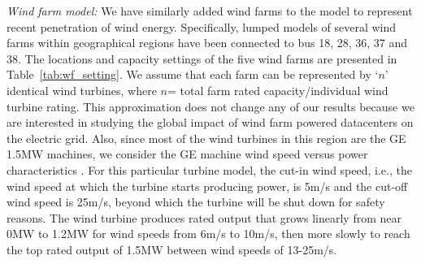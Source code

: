 {\em Wind farm model:}  We have similarly added wind farms to the model to represent recent penetration of wind energy.  Specifically, lumped models of several wind farms within geographical regions have been connected to bus 18, 28, 36, 37 and 38. 
The locations and capacity settings of the five wind farms are presented in Table~\ref{tab:wf_setting}. We assume that each farm can be represented by `$n$' identical wind turbines, where $n$= total farm rated capacity/individual wind turbine rating. This approximation does not change any of our results because we are interested in studying the global impact of wind farm powered datacenters on the electric grid. Also, since most of the wind turbines in this region are the GE 1.5MW machines, we consider the GE machine wind speed versus power characteristics \cite{lei2006modeling}.  For this particular turbine model, the cut-in wind speed, i.e., the wind speed at which the turbine starts producing power, is 5m/s and the cut-off wind speed is 25m/s, beyond which the turbine will be shut down for safety reasons. The wind turbine produces rated output that grows linearly from near 0MW to 1.2MW for wind speeds from 6m/s to 10m/s, then more slowly to reach the top rated output of 1.5MW between wind speeds of 13-25m/s.




